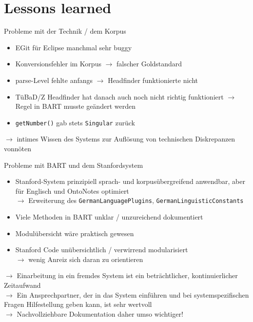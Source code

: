 \documentclass[11pt,a4paper]{beamer}
\begin{document}
\section{Lessons learned}
\begin{frame}{Probleme mit der Technik / dem Korpus}
\begin{itemize}
\item EGit für Eclipse manchmal sehr buggy
\item Konversionsfehler im Korpus $\rightarrow$ falscher Goldstandard
\item parse-Level fehlte anfangs $\rightarrow$ Headfinder funktionierte nicht
\item TüBaD/Z Headfinder hat danach auch noch nicht richtig funktioniert $\rightarrow$ Regel in BART musste geändert werden
\item \texttt{getNumber()} gab stets \texttt{Singular} zurück 
\end{itemize}
$\rightarrow$ intimes Wissen des Systems zur Auflösung von technischen Diskrepanzen vonnöten

\end{frame}

\begin{frame}{Probleme mit BART und dem Stanfordsystem}
\begin{itemize}
\item Stanford-System prinzipiell sprach- und korpusübergreifend anwendbar, aber für Englisch und OntoNotes optimiert\\
$\rightarrow$ Erweiterung des \texttt{GermanLanguagePlugins}, \texttt{GermanLinguisticConstants}
\item Viele Methoden in BART unklar / unzureichend dokumentiert
\item Modulübersicht wäre praktisch gewesen
\item Stanford Code unübersichtlich / verwirrend modularisiert\\$\rightarrow$ wenig Anreiz sich daran zu orientieren
\end{itemize}
$\rightarrow$ Einarbeitung in ein fremdes System ist ein beträchtlicher, kontinuierlicher Zeitaufwand\\
$\rightarrow$ Ein Ansprechpartner, der in das System einführen und bei systemspezifischen Fragen Hilfestellung geben kann, ist sehr wertvoll\\
$\rightarrow$ Nachvollziehbare Dokumentation daher umso wichtiger!
\end{frame}
\end{document}
